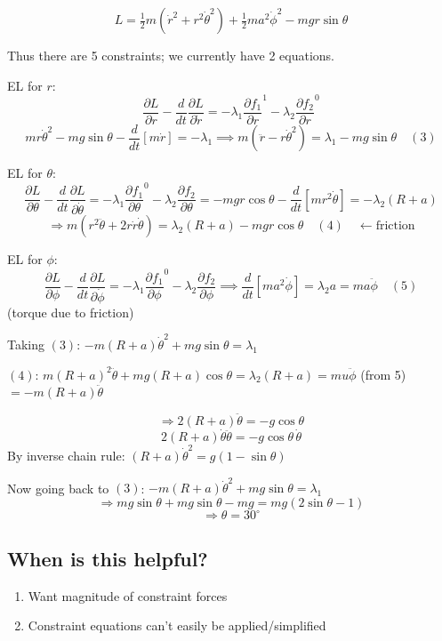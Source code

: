 \[
    L = \tfrac{1}{2}m(\dot{r}^2 + r^2\dot{\theta}^2) + \tfrac{1}{2}ma^2\dot{\phi}^2 - mgr\sin\theta
\]

Thus there are 5 constraints; we currently have 2 equations.

EL for $r$:
\[
    \frac{\partial L}{\partial r} - \frac{d}{dt}\frac{\partial L}{\partial \dot{r}} = -\lambda_1 \frac{\partial f_1}{\partial r}^{1} - \lambda_2 \frac{\partial f_2}{\partial r}^{0}
\]
\[
    mr\dot{\theta}^2 - mg\sin\theta - \frac{d}{dt}\!\left[m\dot{r}\right] = -\lambda_1 \implies \boxed{m(\ddot{r} - r\dot{\theta}^2) = \lambda_1 - mg\sin\theta} \quad (3)
\]

EL for $\theta$:
\[
    \frac{\partial L}{\partial \theta} - \frac{d}{dt}\frac{\partial L}{\partial \dot{\theta}} = -\lambda_1 \frac{\partial f_1}{\partial \theta}^{0} - \lambda_2 \frac{\partial f_2}{\partial \theta} = -mgr\cos\theta - \frac{d}{dt}\!\left[mr^2\dot{\theta}\right] = -\lambda_2(R+a)
\]
\[
    \Rightarrow \boxed{m(r^2\ddot{\theta} + 2r\dot{r}\dot{\theta}) = \lambda_2(R+a) - mgr\cos\theta} \quad (4) \quad \leftarrow \text{friction}
\]

EL for $\phi$:
\[
    \frac{\partial L}{\partial \phi} - \frac{d}{dt}\frac{\partial L}{\partial \dot{\phi}} = -\lambda_1 \frac{\partial f_1}{\partial \phi}^{0} - \lambda_2 \frac{\partial f_2}{\partial \phi} \implies \frac{d}{dt}\!\left[ma^2\dot{\phi}\right] = \boxed{\lambda_2 a = ma\ddot{\phi}} \quad (5)
\]
(torque due to friction)

Taking $(3)$: $-m(R+a)\dot{\theta}^2 + mg\sin\theta = \lambda_1$

$(4)$: $m(R+a)^2\ddot{\theta} + mg(R+a)\cos\theta = \lambda_2(R+a) = mu\ddot{\phi}$ (from 5) $= -m(R+a)\ddot{\theta}$

\[
    \Rightarrow 2(R+a)\ddot{\theta} = -g\cos\theta
\]
\[
    2(R+a)\dot{\theta}\ddot{\theta} = -g\cos\theta\,\dot{\theta}
\]
By inverse chain rule: $(R+a)\dot{\theta}^2 = g(1-\sin\theta)$

Now going back to $(3)$: $-m(R+a)\dot{\theta}^2 + mg\sin\theta = \lambda_1$
\[
    \Rightarrow mg\sin\theta + mg\sin\theta - mg = mg(2\sin\theta - 1)
\]
\[
    \Rightarrow \theta = 30^\circ
\]

\subsection*{When is this helpful?}
\begin{enumerate}
    \item Want magnitude of constraint forces
    \item Constraint equations can't easily be applied/simplified
\end{enumerate}

